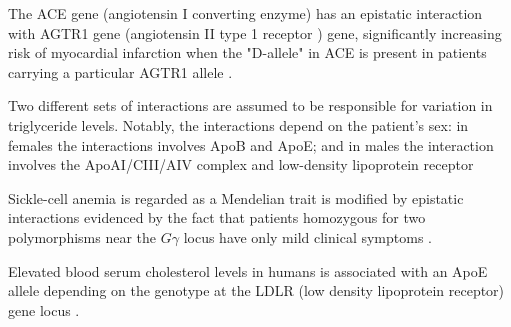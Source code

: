 The ACE gene (angiotensin I converting enzyme) has an epistatic interaction with AGTR1 gene (angiotensin II type 1 receptor ) gene, significantly increasing risk of myocardial infarction when the "D-allele" in ACE  is present in patients carrying a particular AGTR1 allele \cite{carlborg2004epistasis:REF}.

Two different sets of interactions are assumed to be responsible for variation in triglyceride levels.
Notably, the interactions depend on the patient's sex: in females the interactions involves ApoB and ApoE;  and in males the interaction involves the ApoAI/CIII/AIV complex and low-density lipoprotein receptor \cite{culverhouse2002perspective:REF}

Sickle-cell anemia is regarded as a Mendelian trait is modified by epistatic interactions evidenced by the fact that patients homozygous for two polymorphisms near the $G\gamma$ locus have only mild clinical symptoms \cite{culverhouse2002perspective:REF}.

Elevated blood serum cholesterol levels in humans is associated with an ApoE allele depending on the genotype at the LDLR (low density lipoprotein receptor) gene locus \cite{tyler2009shadows:REF}.

